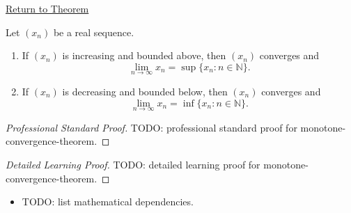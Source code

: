 \newpage
{}
\label{prf:monotone-convergence-theorem}

\begin{remark*}[Return]
\hyperref[thm:monotone-convergence-theorem]{Return to Theorem}
\end{remark*}

\begin{theorem*}
Let $(x_n)$ be a real sequence.
\begin{enumerate}[label=(\alph*)]
  \item If $(x_n)$ is increasing and bounded above, then $(x_n)$ converges and
  \[
    \lim_{n\to\infty}x_n=\sup\{x_n:n\in\mathbb{N}\}.
  \]
  \item If $(x_n)$ is decreasing and bounded below, then $(x_n)$ converges and
  \[
    \lim_{n\to\infty}x_n=\inf\{x_n:n\in\mathbb{N}\}.
  \]
\end{enumerate}

\smallskip
\noindent
\end{theorem*}

\begin{proof}[Professional Standard Proof]
\LRAProofBodyStart
TODO: professional standard proof for monotone-convergence-theorem.
\end{proof}

\begin{proof}[Detailed Learning Proof]
\LRAProofBodyStart
TODO: detailed learning proof for monotone-convergence-theorem.
\end{proof}

\begin{remark*}
\end{remark*}

\begin{dependencies}
\begin{itemize}
  \item TODO: list mathematical dependencies.
\end{itemize}
\end{dependencies}

\clearpage
